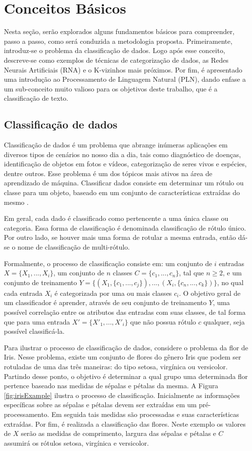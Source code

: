 \chapter{Conceitos Básicos}
Nesta seção, serão explorados alguns fundamentos básicos para compreender, passo a passo, como será conduzida a metodologia proposta. Primeiramente, introduz-se o problema da classificação de dados. Logo após esse conceito, descreve-se como exemplos de técnicas de categorização de dados, as Redes Neurais Artificiais (RNA) e o K-vizinhos mais próximos. Por fim, é apresentado uma introdução ao Processamento de Linguagem Natural (PLN), dando enfase a um sub-conceito muito valioso para os objetivos deste trabalho, que é a classificação de texto.

\section{Classificação de dados}
Classificação de dados é um problema que abrange inúmeras aplicações em diversos tipos de cenários no nosso dia a dia, tais como diagnóstico de doenças, identificação de objetos em fotos e vídeos, categorização de seres vivos e espécies, dentre outros. Esse problema é um dos tópicos mais ativos na área de aprendizado de máquina. Classificar dados consiste em determinar um rótulo ou classe para um objeto, baseado em um conjunto de características extraídas do mesmo \citep{duda1973pattern,bishop2006pattern}. 

Em geral, cada dado é classificado como pertencente a uma única classe ou categoria. Essa forma de classificação é denominada classificação de rótulo único. Por outro lado, se houver mais uma forma de rotular a mesma entrada, então dá-se o nome de classificação de multi-rótulo. 

Formalmente, o processo de classificação consiste em: um conjunto de $i$ entradas $X = \{X_1,...,X_i\}$, um conjunto de $n$ classes $C = \{c_1,...,c_n\}$, tal que $n \geq 2$, e um conjunto de treinamento $Y = \{(X_1, \{c_1,...,c_j\}),...,(X_i, \{c_n,...,c_k\})\}$, no qual cada entrada $X_i$ é categorizada por uma ou mais classes $c_i$. O objetivo geral de um classificador é aprender, através de seu conjunto de treinamento $Y$, uma possível correlação entre os atributos das entradas com suas classes, de tal forma que para uma entrada $X' = \{X'_1,...,X'_i\}$ que não possua rótulo $c$ qualquer, seja possível classificá-la.

Para ilustrar o processo de classificação de dados, considere o problema da flor de Iris. Nesse problema, existe um conjunto de flores do gênero Iris que podem ser rotuladas de uma das três maneiras: do tipo setosa, virgínica ou versicolor. Partindo desse ponto, o objetivo é determinar a qual grupo uma determinada flor pertence baseado nas medidas de sépalas e pétalas da mesma. A Figura \ref{fig:irisExample} ilustra o processo de classificação. Inicialmente as informações específicas sobre as sépalas e pétalas devem ser extraídas em um pré-processamento. Em seguida tais medidas são processadas e suas características extraídas. Por fim, é realizada a classificação das flores. Neste exemplo os valores de $X$ serão as medidas de comprimento, largura das sépalas e pétalas e $C$ assumirá os rótulos setosa, virgínica e versicolor.

